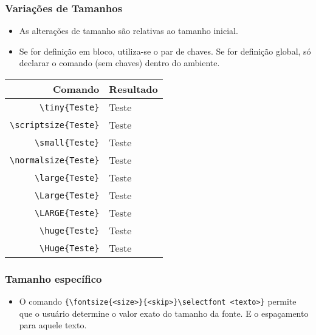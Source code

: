 \documentclass[brazilian]{beamer}
\begin{document}
\begin{frame}[fragile]
    \frametitle{Variações de Tamanhos}

    \begin{itemize}
        \item As alterações de tamanho são relativas ao tamanho inicial.
        \item Se for definição em bloco, utiliza-se o par de chaves. Se for definição global, só declarar o comando (sem chaves) dentro do ambiente.
    \end{itemize}

    \begin{table}[h]
        \begin{tabular}{r|l}
            Comando                 & Resultado          \\ \hline
            \lstinline[style=myStyleLatex]!\tiny{Teste}! & \tiny{Teste}       \\ \hline
            \lstinline[style=myStyleLatex]!\scriptsize{Teste}! & \scriptsize{Teste} \\ \hline
            \lstinline[style=myStyleLatex]!\small{Teste}! & \small{Teste}      \\ \hline
            \lstinline[style=myStyleLatex]!\normalsize{Teste}! & \normalsize{Teste} \\ \hline
            \lstinline[style=myStyleLatex]!\large{Teste}! & \large{Teste}      \\ \hline
            \lstinline[style=myStyleLatex]!\Large{Teste}! & \Large{Teste}      \\ \hline
            \lstinline[style=myStyleLatex]!\LARGE{Teste}! & \LARGE{Teste}      \\ \hline
            \lstinline[style=myStyleLatex]!\huge{Teste}! & \huge{Teste}       \\ \hline
            \lstinline[style=myStyleLatex]!\Huge{Teste}! & \Huge{Teste}       \\ \hline
        \end{tabular}
    \end{table}

\end{frame}

\begin{frame}[fragile]
    \frametitle{Tamanho específico}

    \begin{itemize}
        \item O comando \lstinline[style=myStyleLatex]!{\fontsize{<size>}{<skip>}\selectfont <texto>}! permite que o usuário determine o valor exato do tamanho da fonte. E o espaçamento para aquele texto.
    \end{itemize}

\end{frame}
\end{document}
